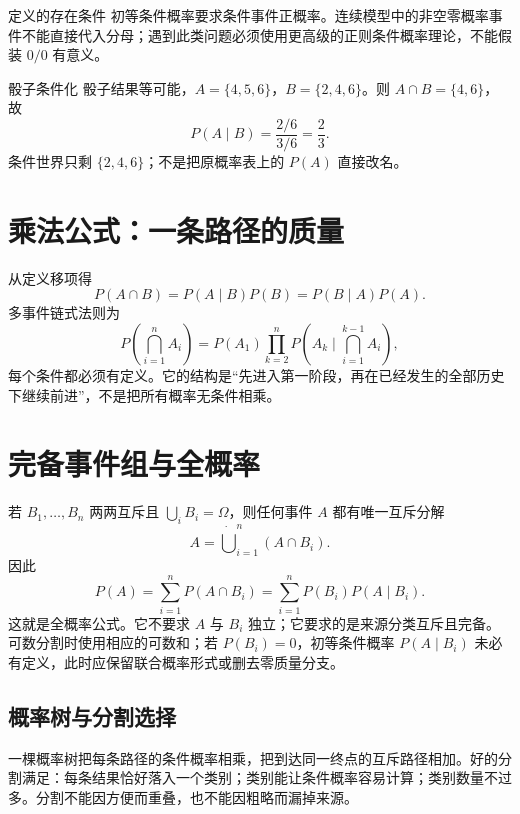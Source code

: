 \documentclass[11pt,a4paper]{ctexart}
\newenvironment{handbookdiagram}{\par\vspace{0.4em}\noindent\begin{center}}{\end{center}\vspace{0.4em}}
\begin{document}
\begin{handbookdiagram}
\resizebox{0.92\linewidth}{!}{%
%
}
\end{handbookdiagram}

\begin{warnbox}{定义的存在条件}
初等条件概率要求条件事件正概率。连续模型中的非空零概率事件不能直接代入分母；遇到此类问题必须使用更高级的正则条件概率理论，不能假装 $0/0$ 有意义。
\end{warnbox}

\begin{examplebox}{骰子条件化}
骰子结果等可能，$A=\{4,5,6\}$，$B=\{2,4,6\}$。则 $A\cap B=\{4,6\}$，故
\[
P(A\mid B)=\frac{2/6}{3/6}=\frac23.
\]
条件世界只剩 $\{2,4,6\}$；不是把原概率表上的 $P(A)$ 直接改名。
\end{examplebox}

\section{乘法公式：一条路径的质量}

从定义移项得
\[
\boxed{P(A\cap B)=P(A\mid B)P(B)=P(B\mid A)P(A)}.
\]
多事件链式法则为
\[
\boxed{P\!\left(\bigcap_{i=1}^nA_i\right)=P(A_1)\prod_{k=2}^{n}P\!\left(A_k\mid\bigcap_{i=1}^{k-1}A_i\right)},
\]
每个条件都必须有定义。它的结构是“先进入第一阶段，再在已经发生的全部历史下继续前进”，不是把所有概率无条件相乘。

\section{完备事件组与全概率}

若 $B_1,\ldots,B_n$ 两两互斥且 $\bigcup_iB_i=\Omega$，则任何事件 $A$ 都有唯一互斥分解
\[
A=\mathbin{\dot\bigcup}_{i=1}^{n}(A\cap B_i).
\]
因此
\[
\boxed{P(A)=\sum_{i=1}^{n}P(A\cap B_i)=\sum_{i=1}^{n}P(B_i)P(A\mid B_i)}.
\]
这就是全概率公式。它不要求 $A$ 与 $B_i$ 独立；它要求的是来源分类互斥且完备。可数分割时使用相应的可数和；若 $P(B_i)=0$，初等条件概率 $P(A\mid B_i)$ 未必有定义，此时应保留联合概率形式或删去零质量分支。

\subsection{概率树与分割选择}

一棵概率树把每条路径的条件概率相乘，把到达同一终点的互斥路径相加。好的分割满足：每条结果恰好落入一个类别；类别能让条件概率容易计算；类别数量不过多。分割不能因方便而重叠，也不能因粗略而漏掉来源。
\end{document}

